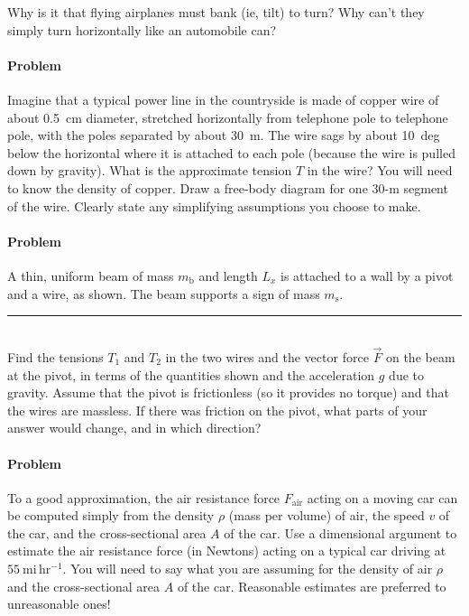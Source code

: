 \documentclass[12pt]{article}
\newcounter{problem}
\begin{document}
Why is it that flying airplanes must bank (ie, tilt) to turn?  Why
can't they simply turn horizontally like an automobile can?

\paragraph{Problem~\theproblem}

Imagine that a typical power line in the countryside is made of copper
wire of about 0.5~cm diameter, stretched horizontally from telephone
pole to telephone pole, with the poles separated by about 30~m.  The
wire sags by about 10~deg below the horizontal where it is attached to
each pole (because the wire is pulled down by gravity).  What is the
approximate tension $T$ in the wire?  You will need to know the
density of copper.  Draw a free-body diagram for one 30-m segment of
the wire.  Clearly state any simplifying assumptions you choose to
make.

\paragraph{Problem~\theproblem}

A thin, uniform beam of mass $m_\mathrm{b}$ and length $L_x$ is
attached to a wall by a pivot and a wire, as shown.  The beam supports
a sign of mass $m_\mathrm{s}$.
\\ \rule{0.35\textwidth}{0pt}
\\
Find the tensions $T_1$ and $T_2$ in the two wires and the vector
force $\vec{F}$ on the beam at the pivot, in terms of the quantities
shown and the acceleration $g$ due to gravity.  Assume that the pivot
is frictionless (so it provides no torque) and that the wires are
massless.  If there was friction on the pivot, what parts of your
answer would change, and in which direction?

\paragraph{Problem~\theproblem}

To a good approximation, the air resistance force $F_\mathrm{air}$
acting on a moving car can be computed simply from the density $\rho$
(mass per volume) of air, the speed $v$ of the car, and the
cross-sectional area $A$ of the car.  Use a dimensional argument to
estimate the air resistance force (in Newtons) acting on a typical car
driving at $55~\mathrm{mi\,hr^{-1}}$.  You will need to say what you
are assuming for the density of air $\rho$ and the cross-sectional
area $A$ of the car.  Reasonable estimates are preferred to
unreasonable ones!
\end{document}
